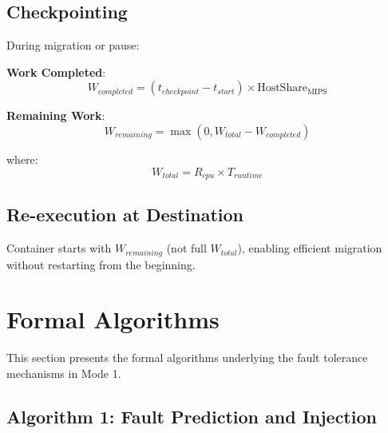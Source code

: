 \documentclass[12pt,a4paper]{article}
\begin{document}
\subsection{Checkpointing}

During migration or pause:

\textbf{Work Completed}:
\begin{equation}
    W_{completed} = (t_{checkpoint} - t_{start}) \times \text{HostShare}_{\text{MIPS}}
\end{equation}

\textbf{Remaining Work}:
\begin{equation}
    W_{remaining} = \max(0, W_{total} - W_{completed})
\end{equation}

where:
\begin{equation}
    W_{total} = R_{cpu} \times T_{runtime}
\end{equation}

\subsection{Re-execution at Destination}

Container starts with $W_{remaining}$ (not full $W_{total}$), enabling efficient migration without restarting from the beginning.

\section{Formal Algorithms}

This section presents the formal algorithms underlying the fault tolerance mechanisms in Mode 1.

\subsection{Algorithm 1: Fault Prediction and Injection}
\end{document}
